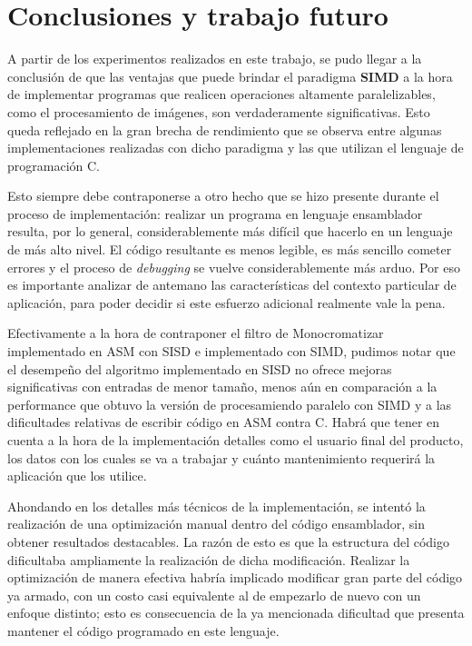 \section{Conclusiones y trabajo futuro}

    A partir de los experimentos realizados en este trabajo, se pudo llegar a la conclusión de que las ventajas que puede brindar el paradigma \textbf{SIMD} a la hora de implementar programas que realicen operaciones altamente paralelizables, como el procesamiento de imágenes, son verdaderamente significativas. Esto queda reflejado en la gran brecha de rendimiento que se observa entre algunas implementaciones realizadas con dicho paradigma y las que utilizan el lenguaje de programación C.

    Esto siempre debe contraponerse a otro hecho que se hizo presente durante el proceso de implementación: realizar un programa en lenguaje ensamblador resulta, por lo general, considerablemente más difícil que hacerlo en un lenguaje de más alto nivel. El código resultante es menos legible, es más sencillo cometer errores y el proceso de \emph{debugging} se vuelve considerablemente más arduo. Por eso es importante analizar de antemano las características del contexto particular de aplicación, para poder decidir si este esfuerzo adicional realmente vale la pena.

    Efectivamente a la hora de contraponer el filtro de Monocromatizar implementado en ASM con SISD e implementado con SIMD, pudimos notar que el desempeño del algoritmo implementado en SISD no ofrece mejoras significativas con entradas de menor tamaño, menos aún en comparación a la performance que obtuvo la versión de procesamiendo paralelo con SIMD y a las dificultades relativas de escribir código en ASM contra C. Habrá que tener en cuenta a la hora de la implementación detalles como el usuario final del producto, los datos con los cuales se va a trabajar y cuánto mantenimiento requerirá la aplicación que los utilice.

    Ahondando en los detalles más técnicos de la implementación, se intentó la realización de una optimización manual dentro del código ensamblador, sin obtener resultados destacables. La razón de esto es que la estructura del código dificultaba ampliamente la realización de dicha modificación. Realizar la optimización de manera efectiva habría implicado modificar gran parte del código ya armado, con un costo casi equivalente al de empezarlo de nuevo con un enfoque distinto; esto es consecuencia de la ya mencionada dificultad que presenta mantener el código programado en este lenguaje.

